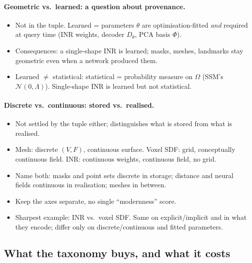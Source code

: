 \paragraph{Geometric vs.\ learned: a question about provenance.}
\begin{itemize}
    \item Not in the tuple. Learned = parameters $\theta$ are optimisation-fitted \emph{and} required at query time (INR weights, decoder $D_\theta$, PCA basis $\Phi$).
    \item Consequences: a single-shape INR is learned; masks, meshes, landmarks stay geometric even when a network produced them.
    \item Learned $\neq$ statistical: statistical = probability measure on $\Omega$ (SSM's $\mathcal{N}(0,\Lambda)$). Single-shape INR is learned but not statistical.
\end{itemize}

\paragraph{Discrete vs.\ continuous: stored vs.\ realised.}
\begin{itemize}
    \item Not settled by the tuple either; distinguishes what is stored from what is realised.
    \item Mesh: discrete $(V,F)$, continuous surface. Voxel SDF: grid, conceptually continuous field. INR: continuous weights, continuous field, no grid.
    \item Name both: masks and point sets discrete in storage; distance and neural fields continuous in realisation; meshes in between.
\end{itemize}

\begin{itemize}
    \item Keep the axes separate, no single ``modernness'' score.
    \item Sharpest example: INR vs.\ voxel SDF. Same on explicit/implicit and in what they encode; differ only on discrete/continuous and fitted parameters.
\end{itemize}

\subsection{What the taxonomy buys, and what it costs}
\label{sec:shape-closing}

